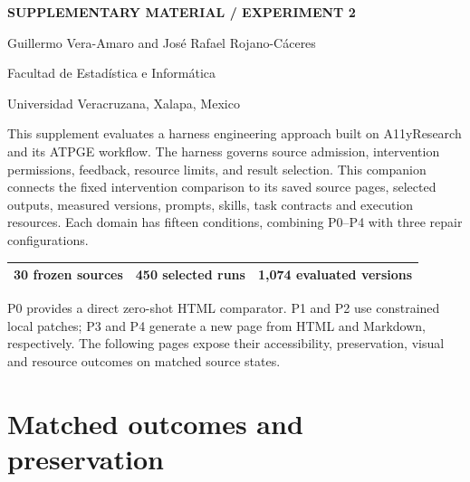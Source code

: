 \documentclass[acmsmall,screen,nonacm]{acmart}
\begin{document}
\raggedbottom
\pagestyle{plain}
\begin{titlepage}
\vspace*{12pt}
\noindent\textcolor{HarnessBlue}{\textbf{SUPPLEMENTARY MATERIAL / EXPERIMENT 2}}\par\bigskip
{}
\medskip
{}
\vspace{22pt}
\noindent Guillermo Vera-Amaro and José Rafael Rojano-Cáceres\par
\medskip
\noindent Facultad de Estadística e Informática\par
\noindent Universidad Veracruzana, Xalapa, Mexico\par
\vspace{24pt}
\noindent{\Large\bfseries\textcolor{HarnessBlue}{Experiment 2. Fixed intervention trade-offs}\par}
\medskip
This supplement evaluates a harness engineering approach built on A11yResearch and its ATPGE workflow. The harness governs source admission, intervention permissions, feedback, resource limits, and result selection. This companion connects the fixed intervention comparison to its saved source pages, selected outputs, measured versions, prompts, skills, task contracts and execution resources. Each domain has fifteen conditions, combining P0--P4 with three repair configurations.\par\bigskip
\noindent\begin{tabular*}{\linewidth}{@{\extracolsep{\fill}}lll@{}}\toprule
\textbf{30} frozen sources & \textbf{450} selected runs & \textbf{1,074} evaluated versions\\\bottomrule
\end{tabular*}\par\bigskip
P0 provides a direct zero-shot HTML comparator. P1 and P2 use constrained local patches; P3 and P4 generate a new page from HTML and Markdown, respectively. The following pages expose their accessibility, preservation, visual and resource outcomes on matched source states.
\end{titlepage}

\section{Matched outcomes and preservation}
\end{document}
